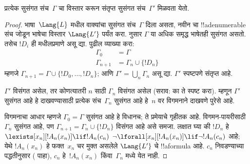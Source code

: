 \documentclass[../../../include/open-logic-section]{subfiles}
\begin{document}
\begin{lem}
प्रत्येक सुसंगत संच~$\Gamma$ चा विस्तार करून संतृप्त सुसंगत
संच~$\Gamma'$ मिळवता येतो.
\end{lem}

\begin{proof}
भाषा~$\Lang{L}$ मधील वाक्यांचा सुसंगत संच~$\Gamma$ दिला असता,
नवीन चा !!a{denumerable} संच जोडून भाषेचा विस्तार
$\Lang{L'}$ पर्यंत करा.  नुसार $\Gamma$ या अधिक
समृद्ध भाषेतही सुसंगत असतो. तसेच $!D_i$ ही
 मधीलप्रमाणे असू द्या. पुढील व्याख्या करा:
\begin{align*}
\Gamma_0 & = \Gamma \\
\Gamma_{n+1} & = \Gamma_n \cup \{!D_n \}
\end{align*}
म्हणजे $\Gamma_{n+1} = \Gamma \cup \{ !D_0, \dots, !D_n \}$; आणि
$\Gamma' = \bigcup_{n} \Gamma_n$ असू द्या. $\Gamma'$ स्पष्टपणे संतृप्त आहे.

$\Gamma'$ विसंगत असेल, तर कोणत्यातरी $n$ साठी $\Gamma_n$ विसंगत असेल
(सराव: का ते स्पष्ट करा). म्हणून $\Gamma'$ सुसंगत आहे हे दाखवण्यासाठी
प्रत्येक संच~$\Gamma_n$ सुसंगत आहे हे~$n$ वर विगमनाने दाखवणे पुरेसे आहे.

विगमनाचा आधार म्हणजे $\Gamma_0 = \Gamma$ सुसंगत आहे हे विधानच; ते
प्रमेयाचे गृहीतक आहे. विगमन-पायरीसाठी $\Gamma_{n}$ सुसंगत आहे, पण
$\Gamma_{n+1} = \Gamma_n \cup \{!D_n\}$ विसंगत आहे असे समजा. लक्षात
घ्या की $!D_n$ हे
{$\lexists[x_{n}][!A_{n}(x_n)] \lif !A_{n}(c_{n})$}
{$\lnot\lforall[x_{n}][!A_{n}(x_n)] \lif \lnot !A_{n}(c_{n})$}
आहे; येथे $!A_n(x_n)$ हे फक्त~$x_n$ चर मुक्त असलेले $\Lang{L'}$ चे
!!a{formula} आहे. $c_n$ निवडण्याच्या पद्धतीनुसार
( पाहा), $c_n$ हे~$!A_n(x_n)$ किंवा~$\Gamma_n$
मध्ये येत नाही.


\end{proof}
\end{document}

